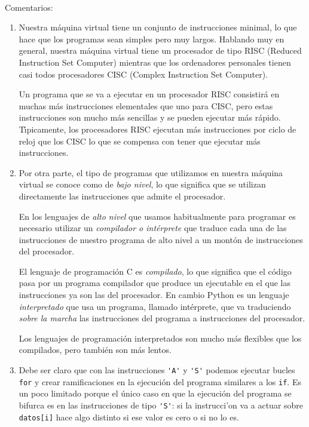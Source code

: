 \begin{appendices}
\

{\sc Comentarios:}

\begin{enumerate}
 \item Nuestra m\'aquina virtual tiene un conjunto de instrucciones minimal, lo
que hace que los programas sean simples pero muy largos. Hablando muy en
general, nuestra m\'aquina virtual tiene un procesador de tipo RISC (Reduced
Instruction Set Computer) mientras que los ordenadores personales tienen casi
todos procesadores CISC (Complex
Instruction Set Computer).
 
 Un programa que se va a ejecutar en un procesador RISC consistir\'a en muchas
m\'as instrucciones elementales que uno para CISC, pero estas instrucciones son 
mucho m\'as sencillas y se pueden ejecutar m\'as r\'apido. T\'{\i}picamente, los
procesadores RISC ejecutan m\'as instrucciones por ciclo de reloj que los CISC
lo que se compensa con tener que ejecutar m\'as instrucciones.
 
 \item Por otra parte, el tipo de programas que utilizamos en nuestra m\'aquina
virtual se conoce como de {\itshape bajo nivel}, lo que significa que se
utilizan  directamente las instrucciones que admite el procesador. 

En los lenguajes de {\itshape alto nivel} que usamos habitualmente para
programar es necesario utilizar un {\itshape compilador o int\'erprete} que
traduce cada una de las instrucciones de nuestro programa de alto nivel a un
mont\'on de instrucciones del procesador. 
 
 El lenguaje de programaci\'on C es {\itshape compilado}, lo que significa que
 el c\'odigo pasa por un programa compilador que produce un ejecutable en el que
 las instrucciones ya son las del procesador.
 En cambio Python es un lenguaje {\itshape interpretado} que usa un programa,
llamado int\'erprete,  que va 
 traduciendo {\itshape sobre la marcha} las instrucciones del programa a
instrucciones del procesador. 
 
 Los lenguajes de programaci\'on interpretados son mucho m\'as flexibles que los
compilados, pero tambi\'en son m\'as lentos. 
\item Debe ser claro que con las instrucciones \lstinline|'A'| y \lstinline|'S'|
podemos
ejecutar bucles \lstinline|for| y crear ramificaciones en la ejecuci\'on del
programa
similares a los \lstinline|if|. 
Es un poco limitado porque el \'unico caso en que la ejecuci\'on del programa se
bifurca es en las instrucciones de tipo \lstinline|'S'|: si la instrucci'on va a
actuar sobre {\tt datos[i]} hace algo distinto si ese valor es cero o si no lo
es. 


\end{enumerate}
\end{appendices}
